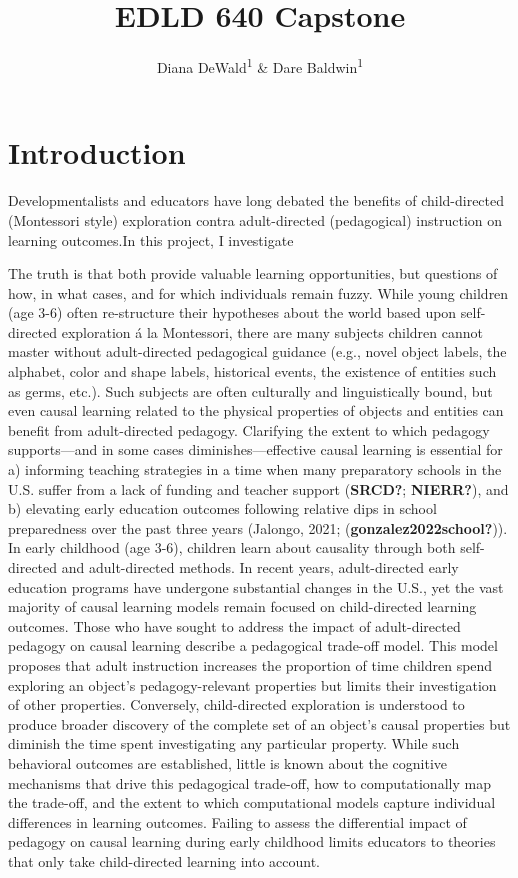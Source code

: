 \documentclass[
  english,
  man]{apa6}
\title{EDLD 640 Capstone}
\author{Diana DeWald\textsuperscript{1} \& Dare Baldwin\textsuperscript{1}}
\date{}
\affiliation{\vspace{0.5cm}\textsuperscript{1} University of Oregon}
\begin{document}
\maketitle

\hypertarget{introduction}{%
\section{Introduction}\label{introduction}}

Developmentalists and educators have long debated the benefits of child-directed (Montessori style) exploration contra adult-directed (pedagogical) instruction on learning outcomes.In this project, I investigate

The truth is that both provide valuable learning opportunities, but questions of how, in what cases, and for which individuals remain fuzzy. While young children (age 3-6) often re-structure their hypotheses about the world based upon self-directed exploration á la Montessori, there are many subjects children cannot master without adult-directed pedagogical guidance (e.g., novel object labels, the alphabet, color and shape labels, historical events, the existence of entities such as germs, etc.). Such subjects are often culturally and linguistically bound, but even causal learning related to the physical properties of objects and entities can benefit from adult-directed pedagogy. Clarifying the extent to which pedagogy supports---and in some cases diminishes---effective causal learning is essential for a) informing teaching strategies in a time when many preparatory schools in the U.S. suffer from a lack of funding and teacher support (\textbf{SRCD?}; \textbf{NIERR?}), and b) elevating early education outcomes following relative dips in school preparedness over the past three years (Jalongo, 2021; (\textbf{gonzalez2022school?})).
In early childhood (age 3-6), children learn about causality through both self-directed and adult-directed methods. In recent years, adult-directed early education programs have undergone substantial changes in the U.S., yet the vast majority of causal learning models remain focused on child-directed learning outcomes. Those who have sought to address the impact of adult-directed pedagogy on causal learning describe a pedagogical trade-off model. This model proposes that adult instruction increases the proportion of time children spend exploring an object's pedagogy-relevant properties but limits their investigation of other properties. Conversely, child-directed exploration is understood to produce broader discovery of the complete set of an object's causal properties but diminish the time spent investigating any particular property. While such behavioral outcomes are established, little is known about the cognitive mechanisms that drive this pedagogical trade-off, how to computationally map the trade-off, and the extent to which computational models capture individual differences in learning outcomes. Failing to assess the differential impact of pedagogy on causal learning during early childhood limits educators to theories that only take child-directed learning into account.
\end{document}
